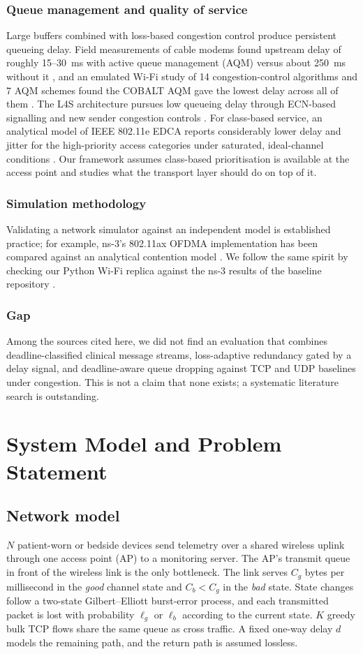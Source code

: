 \documentclass[10pt,twocolumn,letterpaper]{article}
\begin{document}
\subsubsection{Queue management and quality of service}
Large buffers combined with loss-based congestion control produce persistent queueing delay. Field measurements of cable modems found upstream delay of roughly 15--30~ms with active queue management (AQM) versus about 250~ms without it \cite{livingood2022}, and an emulated Wi-Fi study of 14 congestion-control algorithms and 7 AQM schemes found the COBALT AQM gave the lowest delay across all of them \cite{aoyagi2022}. The L4S architecture pursues low queueing delay through ECN-based signalling and new sender congestion controls \cite{rfc9330}. For class-based service, an analytical model of IEEE 802.11e EDCA reports considerably lower delay and jitter for the high-priority access categories under saturated, ideal-channel conditions \cite{sitaram2021}. Our framework assumes class-based prioritisation is available at the access point and studies what the transport layer should do on top of it.

\subsubsection{Simulation methodology}
Validating a network simulator against an independent model is established practice; for example, ns-3's 802.11ax OFDMA implementation has been compared against an analytical contention model \cite{memoona2025}. We follow the same spirit by checking our Python Wi-Fi replica against the ns-3 results of the baseline repository \cite{repo}.

\subsubsection{Gap}
Among the sources cited here, we did not find an evaluation that combines deadline-classified clinical message streams, loss-adaptive redundancy gated by a delay signal, and deadline-aware queue dropping against TCP and UDP baselines under congestion. This is not a claim that none exists; a systematic literature search is outstanding.

\section{System Model and Problem Statement}
\subsection{Network model}
$N$ patient-worn or bedside devices send telemetry over a shared wireless uplink through one access point (AP) to a monitoring server. The AP's transmit queue in front of the wireless link is the only bottleneck. The link serves $C_g$ bytes per millisecond in the \emph{good} channel state and $C_b<C_g$ in the \emph{bad} state. State changes follow a two-state Gilbert--Elliott burst-error process, and each transmitted packet is lost with probability $\ell_g$ or $\ell_b$ according to the current state. $K$ greedy bulk TCP flows share the same queue as cross traffic. A fixed one-way delay $d$ models the remaining path, and the return path is assumed lossless.
\end{document}
